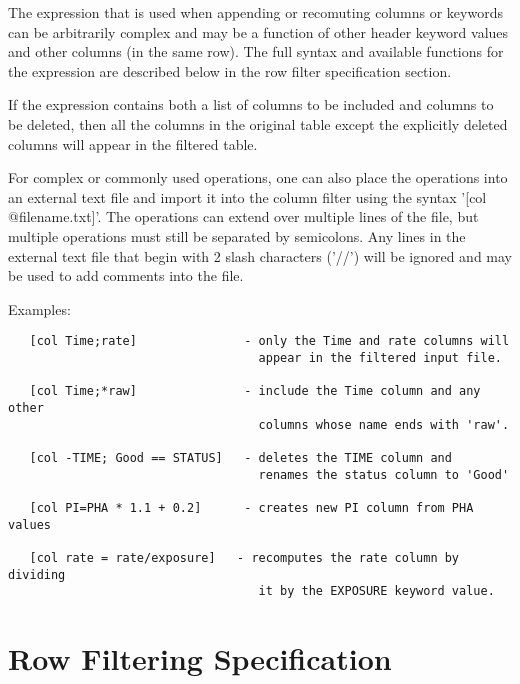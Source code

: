 \documentclass[11pt]{book}
\begin{document}
The expression that is used when appending or recomuting columns or
keywords can be arbitrarily complex and may be a function of other
header keyword values and other columns (in the same row).  The full
syntax and available functions for the expression are described below
in the row filter specification section.

If the expression contains both a list of columns to be included and
columns to be deleted, then all the columns in the original table
except the explicitly deleted columns will appear in the filtered
table.

For  complex  or commonly used operations,  one  can also  place the
operations into an external text  file and import it  into the  column
filter using  the syntax '[col @filename.txt]'.   The operations can
extend over multiple lines of the  file, but multiple operations must
still be separated by semicolons.   Any lines in the external text file
that begin with 2 slash characters ('//') will be ignored and may be
used to add comments into the file.

Examples:

\begin{verbatim}
   [col Time;rate]               - only the Time and rate columns will
                                   appear in the filtered input file.

   [col Time;*raw]               - include the Time column and any other
                                   columns whose name ends with 'raw'.

   [col -TIME; Good == STATUS]   - deletes the TIME column and
                                   renames the status column to 'Good'

   [col PI=PHA * 1.1 + 0.2]      - creates new PI column from PHA values

   [col rate = rate/exposure]   - recomputes the rate column by dividing
                                   it by the EXPOSURE keyword value.
\end{verbatim}


\section{Row Filtering Specification}
\end{document}
